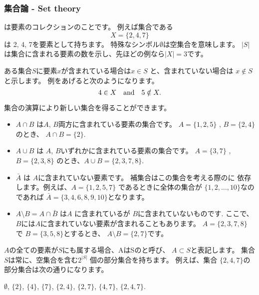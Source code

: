 \subsubsection{集合論 - Set theory}


は要素のコレクションのことです。
例えば集合である
\[X=\{2,4,7\}\]
は 2, 4, 7を要素として持ちます。
特殊なシンボル$\emptyset$は空集合を意味します。
$|S|$は集合に含まれる要素の数を示し、先ほどの例なら$|X|=3$です。

ある集合$S$に要素$x$が含まれている場合は$x \in S$
と、含まれていない場合は $x \notin S$と示します。
例をあげると次のようになります。
\[4 \in X \hspace{10px}\textrm{and}\hspace{10px} 5 \notin X.\]

\begin{samepage}
集合の演算により新しい集合を得ることができます。
\begin{itemize}
\item {} $A \cap B$ は$A$, $B$両方に含まれている要素の集合です。
$A=\{1,2,5\}$ , $B=\{2,4\}$のとき、 $A \cap B = \{2\}$.
\item {} $A \cup B$ は $A$, $B$いずれかに含まれている要素の集合です。
$A=\{3,7\}$ , $B=\{2,3,8\}$ のとき、$A \cup B = \{2,3,7,8\}$.
\item {} $\bar A$ は $A$に含まれていない要素です。
補集合はこの集合を考える際のに
依存します。例えば、$A=\{1,2,5,7\}$ であるときに全体の集合が
$\{1,2,\ldots,10\}$なのであれば $\bar A = \{3,4,6,8,9,10\}$となります。
\item {} $A \setminus B = A \cap \bar B$
は$A$ に含まれているが $B$に含まれていないものです.
ここで、$B$には$A$に含まれていない要素が含まれることもあります。
$A=\{2,3,7,8\}$ で $B=\{3,5,8\}$とするとき、
$A \setminus B = \{2,7\}$です。
\end{itemize}
\end{samepage}

$A$の全ての要素が$S$にも属する場合、AはSのと呼び、
$A \subset S$と表記します。
集合$S$は常に、空集合を含む$2^{|S|}$ 個の部分集合を持ちます。
例えば、集合 $\{2,4,7\}$の部分集合は次の通りになります。
\begin{center}
$\emptyset$,
$\{2\}$, $\{4\}$, $\{7\}$, $\{2,4\}$, $\{2,7\}$, $\{4,7\}$, $\{2,4,7\}$.
\end{center}

